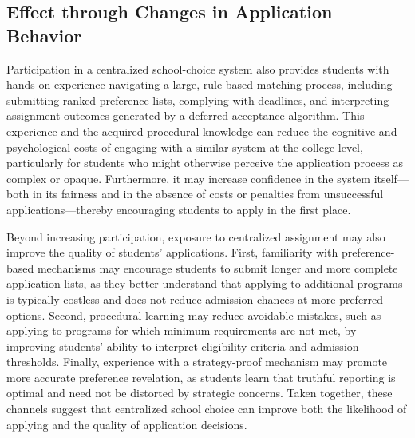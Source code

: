 

\subsection{Effect through Changes in Application Behavior}

Participation in a centralized school-choice system also provides students with hands-on experience navigating a large, rule-based matching process, including submitting ranked preference lists, complying with deadlines, and interpreting assignment outcomes generated by a deferred-acceptance algorithm. This experience and the acquired procedural knowledge can reduce the cognitive and psychological costs of engaging with a similar system at the college level, particularly for students who might otherwise perceive the application process as complex or opaque. Furthermore, it may increase confidence in the system itself—both in its fairness and in the absence of costs or penalties from unsuccessful applications—thereby encouraging students to apply in the first place.

Beyond increasing participation, exposure to centralized assignment may also improve the quality of students' applications. First, familiarity with preference-based mechanisms may encourage students to submit longer and more complete application lists, as they better understand that applying to additional programs is typically costless and does not reduce admission chances at more preferred options. Second, procedural learning may reduce avoidable mistakes, such as applying to programs for which minimum requirements are not met, by improving students' ability to interpret eligibility criteria and admission thresholds. Finally, experience with a strategy-proof mechanism may promote more accurate preference revelation, as students learn that truthful reporting is optimal and need not be distorted by strategic concerns. Taken together, these channels suggest that centralized school choice can improve both the likelihood of applying and the quality of application decisions.



